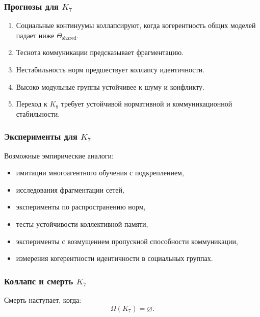 \subsubsection{Прогнозы для \texorpdfstring{$K_7$}{K_7}}

\begin{enumerate}
    \item Социальные континуумы коллапсируют, когда когерентность общих моделей
      падает ниже $\Theta_{\mathrm{shared}}$.
    \item Теснота коммуникации предсказывает фрагментацию.
    \item Нестабильность норм предшествует коллапсу идентичности.
    \item Высоко модульные группы устойчивее к шуму и конфликту.
    \item Переход к $K_8$ требует устойчивой нормативной и коммуникационной
      стабильности.
\end{enumerate}

\subsubsection{Эксперименты для \texorpdfstring{$K_7$}{K_7}}

Возможные эмпирические аналоги:
\begin{itemize}
    \item имитации многоагентного обучения с подкреплением,
    \item исследования фрагментации сетей,
    \item эксперименты по распространению норм,
    \item тесты устойчивости коллективной памяти,
    \item эксперименты с возмущением пропускной способности коммуникации,
    \item измерения когерентности идентичности в социальных группах.
\end{itemize}

\subsubsection{Коллапс и смерть \texorpdfstring{$K_7$}{K_7}}

Смерть наступает, когда:
\[
\Omega(K_7) = \varnothing.
\]

